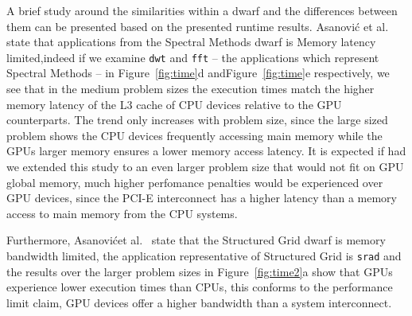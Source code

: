 \documentclass[../document.tex]{subfiles}
\begin{document}
A brief study around the similarities within a dwarf and the differences between them can be presented based on the presented runtime results.
Asanovi\'{c} et al.~\cite{asanovic2006landscape} state that applications from the Spectral Methods dwarf is Memory latency limited,indeed if we examine {\tt dwt} and {\tt fft} -- the applications which represent Spectral Methods -- in Figure~\ref{fig:time}d andFigure~\ref{fig:time}e respectively, we see that in the medium problem sizes the execution times match the higher memory latency of the L3 cache of CPU devices relative to the GPU counterparts.
The trend only increases with problem size, since the large sized problem shows the CPU devices frequently accessing main memory while the GPUs larger memory ensures a lower memory access latency.
It is expected if had we extended this study to an even larger problem size that would not fit on GPU global memory, much higher perfomance penalties would be experienced over GPU devices, since the PCI-E interconnect has a higher latency than a memory access to main memory from the CPU systems.

Furthermore, Asanovi\'{c}et al.~\cite{asanovic2006landscape} state that the Structured Grid dwarf is memory bandwidth limited, the application representative of Structured Grid is {\tt srad} and the results over the larger problem sizes in Figure~\ref{fig:time2}a show that GPUs experience lower execution times than CPUs, this conforms to the performance limit claim, GPU devices offer a higher bandwidth than a system interconnect.

\end{document}
